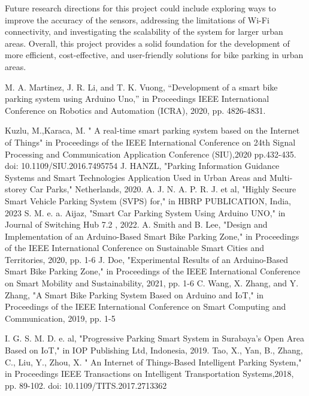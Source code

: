 \documentclass[conference]{IEEEtran}
\begin{document}
	Future research directions for this project could include exploring ways to improve the accuracy of the sensors, addressing the limitations of Wi-Fi connectivity, and investigating the scalability of the system for larger urban areas. Overall, this project provides a solid foundation for the development of more efficient, cost-effective, and user-friendly solutions for bike parking in urban areas.
	
\begin{thebibliography}{00}
	
 M. A. Martinez, J. R. Li, and T. K. Vuong, “Development of a smart bike parking system using Arduino Uno,” in Proceedings IEEE International Conference on Robotics and Automation (ICRA), 2020, pp. 4826-4831.
	
  Kuzlu, M.,Karaca, M. " A real-time smart parking system based on the Internet of Things"  in Proceedings of the IEEE International Conference on 24th Signal Processing and Communication Application Conference (SIU),2020 pp.432-435. doi: 10.1109/SIU.2016.7495754
 J. HANZL, "Parking Information Guidance Systems and Smart Technologies Application Used in Urban Areas and Multi-storey Car Parks," Netherlands, 2020. 
 A. J. N. A. P. R. J. et al, "Highly Secure Smart Vehicle Parking System (SVPS) for," in HBRP PUBLICATION, India, 2023 
 S. M. e. a. Aijaz, "Smart Car Parking System Using Arduino UNO," in Journal of Switching Hub 7.2 , 2022. 
A. Smith and B. Lee, "Design and Implementation of an Arduino-Based Smart Bike Parking Zone," in Proceedings of the IEEE International Conference on Sustainable Smart Cities and Territories, 2020, pp. 1-6
 J. Doe, "Experimental Results of an Arduino-Based Smart Bike Parking Zone," in Proceedings of the IEEE International Conference on Smart Mobility and Sustainability, 2021, pp. 1-6
 C. Wang, X. Zhang, and Y. Zhang, "A Smart Bike Parking System Based on Arduino and IoT," in Proceedings of the IEEE International Conference on Smart Computing and Communication, 2019, pp. 1-5

	I. G. S. M. D. e. al, "Progressive Parking Smart System in Surabaya's Open Area Based on IoT," in IOP Publishing Ltd, Indonesia, 2019. 
Tao, X., Yan, B., Zhang, C., Liu, Y., Zhou, X. " An Internet of Things-Based Intelligent Parking System," in Proceedings IEEE Transactions on Intelligent Transportation Systems,2018, pp. 89-102. doi: 10.1109/TITS.2017.2713362
\end{thebibliography}
\end{document}
